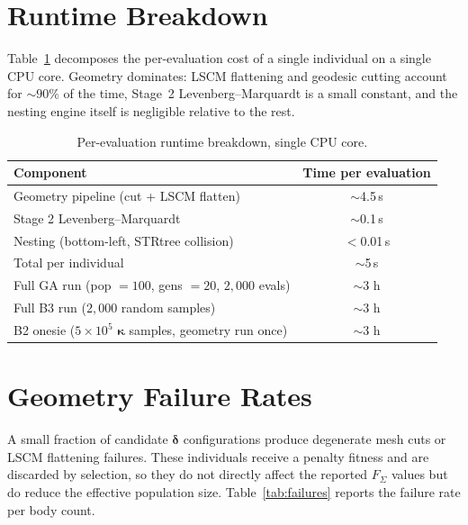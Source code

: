 \documentclass[runningheads]{llncs}
\begin{document}
\section{Runtime Breakdown}
\label{sup:runtime}

Table~\ref{tab:runtime} decomposes the per-evaluation cost of a single
individual on a single CPU core. Geometry dominates: LSCM flattening
and geodesic cutting account for $\sim 90\%$ of the time, Stage~2
Levenberg--Marquardt is a small constant, and the nesting engine itself
is negligible relative to the rest.

\begin{table}[h]
\centering
\caption{Per-evaluation runtime breakdown, single CPU core.}
\label{tab:runtime}
\setlength{\tabcolsep}{5pt}
\begin{tabular}{lc}
\toprule
Component & Time per evaluation \\
\midrule
Geometry pipeline (cut + LSCM flatten)     & ${\sim}$4.5\,s \\
Stage 2 Levenberg--Marquardt                & ${\sim}$0.1\,s \\
Nesting (bottom-left, STRtree collision)    & $<$0.01\,s \\
\midrule
Total per individual                        & ${\sim}$5\,s \\
\midrule
Full GA run (pop $=100$, gens $=20$, $2{,}000$ evals)     & ${\sim}$3 h \\
Full B3 run ($2{,}000$ random samples)                     & ${\sim}$3 h \\
B2 onesie ($5 \times 10^5$ $\boldsymbol{\kappa}$ samples, geometry run once) & ${\sim}$3 h \\
\bottomrule
\end{tabular}
\end{table}

\section{Geometry Failure Rates}
\label{sup:failures}

A small fraction of candidate $\boldsymbol{\delta}$ configurations
produce degenerate mesh cuts or LSCM flattening failures. These
individuals receive a penalty fitness and are discarded by selection,
so they do not directly affect the reported $F_\Sigma$ values but do
reduce the effective population size. Table~\ref{tab:failures} reports
the failure rate per body count.
\end{document}
